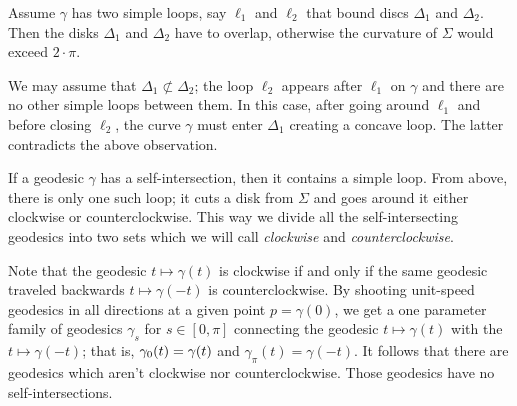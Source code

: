 Assume $\gamma$ has two simple loops, say $\ell_1$ and $\ell_2$ that bound discs $\Delta_1$ and $\Delta_2$.
Then the disks $\Delta_1$ and $\Delta_2$ have to overlap,
otherwise the curvature of $\Sigma$ would exceed $2\cdot\pi$.

We may assume that $\Delta_1\not\subset \Delta_2$; the loop $\ell_2$ appears after $\ell_1$ on $\gamma$ and there are no other simple loops between them.
In this case, after going around $\ell_1$ and before closing $\ell_2$, the curve $\gamma$ must enter $\Delta_1$ creating a concave loop.
The latter contradicts the above observation.

If a geodesic $\gamma$ has a self-intersection,
then it contains a simple loop.
From above, there is only one such loop;
it cuts a disk from $\Sigma$ 
and goes around it either clockwise or counterclockwise.
This way we divide all the self-intersecting geodesics 
into two sets which we will call {}\emph{clockwise} and {}\emph{counterclockwise}.

Note that the geodesic $t\mapsto \gamma(t)$ is clockwise 
if and only if the same geodesic traveled backwards
$t\mapsto \gamma(-t)$
is counterclockwise.
By shooting unit-speed geodesics in all directions at a given point $p=\gamma(0)$,
we get a one parameter family of geodesics $\gamma_s$ for $s\in[0,\pi]$ connecting the geodesic $t\mapsto \gamma(t)$ with
the $t\mapsto \gamma(-t)$; that is, $\gamma_0(t)\z=\gamma(t)$ and $\gamma_\pi(t)=\gamma(-t)$. 
It follows that there are geodesics 
which aren't clockwise nor counterclockwise.
Those geodesics have no self-intersections.\qeds

